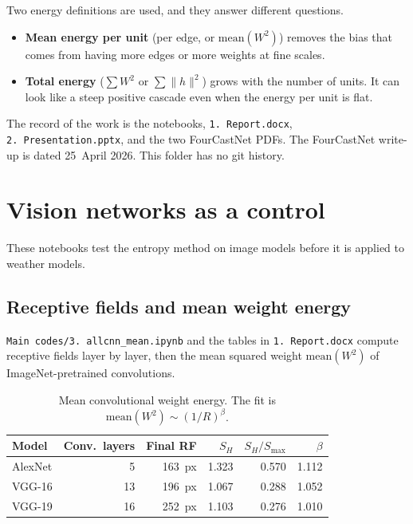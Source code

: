 \documentclass[11pt,a4paper]{article}
\begin{document}
Two energy definitions are used, and they answer different questions.
\begin{itemize}
  \item \textbf{Mean energy per unit} (per edge, or \(\mathrm{mean}(W^2)\)) removes the bias that comes from having more edges or more weights at fine scales.
  \item \textbf{Total energy} (\(\sum W^2\) or \(\sum \|h\|^2\)) grows with the number of units. It can look like a steep positive cascade even when the energy per unit is flat.
\end{itemize}

The record of the work is the notebooks, \texttt{1.~Report.docx}, \texttt{2.~Presentation.pptx}, and the two FourCastNet PDFs.
The FourCastNet write-up is dated 25~April 2026.
This folder has no git history.

\section{Vision networks as a control}
\label{sec:vision}

These notebooks test the entropy method on image models before it is applied to weather models.

\subsection{Receptive fields and mean weight energy}

\texttt{Main codes/3. allcnn\_mean.ipynb} and the tables in \texttt{1.~Report.docx} compute receptive fields layer by layer, then the mean squared weight \(\mathrm{mean}(W^2)\) of ImageNet-pretrained convolutions.

\begin{table}[ht]
  \centering
  \caption{Mean convolutional weight energy. The fit is \(\mathrm{mean}(W^2) \sim (1/R)^{\beta}\).}
  \label{tab:cnn-mean}
  \begin{tabular}{lrrrrr}
    \toprule
    Model & Conv.\ layers & Final RF & \(S_H\) & \(S_H/S_{\max}\) & \(\beta\) \\
    \midrule
    AlexNet & 5  & 163~px & 1.323 & 0.570 & 1.112 \\
    VGG-16  & 13 & 196~px & 1.067 & 0.288 & 1.052 \\
    VGG-19  & 16 & 252~px & 1.103 & 0.276 & 1.010 \\
    \bottomrule
  \end{tabular}
\end{table}
\end{document}
